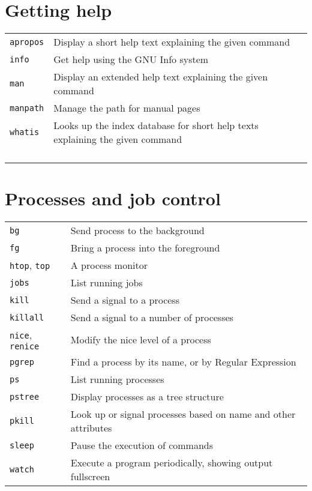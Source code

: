 \documentclass[10pt]{article}
\begin{document}
\begin{multicols}{2}   

\section{Getting help}
\begin{tabular}{ p{2.5cm} p{8.5cm} }
  \hline
  \texttt{apropos} & Display a short help text explaining the given command \\
  \rowcolor{Gray}
  \texttt{info} & Get help using the GNU Info system \\
  \texttt{man} & Display an extended help text explaining the given command \\
  \rowcolor{Gray}
  \texttt{manpath} & Manage the path for manual pages \\
  \texttt{whatis} & Looks up the index database for short help texts explaining the given command\\
  \hline
  & \\
  & \\
  & \\
  & \\
\end{tabular}

\section{Processes and job control}
\begin{tabular}{ p{2.5cm} p{8.5cm} }
  \hline
  \texttt{bg} & Send process to the background \\
  \rowcolor{Gray}
  \texttt{fg} & Bring a process into the foreground \\
  \texttt{htop}, \texttt{top} & A process monitor \\
  \rowcolor{Gray}
  \texttt{jobs} & List running jobs \\
  \texttt{kill} & Send a signal to a process \\
  \rowcolor{Gray}
  \texttt{killall} & Send a signal to a number of processes\\
  \texttt{nice}, \texttt{renice} & Modify the nice level of a process \\
  \rowcolor{Gray}
  \texttt{pgrep} & Find a process by its name, or by Regular Expression \\
  \texttt{ps} & List running processes \\
  \rowcolor{Gray}
  \texttt{pstree} & Display processes as a tree structure \\
  \texttt{pkill} & Look up or signal processes based on name and other attributes\\
  \rowcolor{Gray}
  \texttt{sleep} & Pause the execution of commands \\
  \texttt{watch} & Execute a program periodically, showing output fullscreen \\
  \hline
\end{tabular}


\end{multicols}
\end{document}
